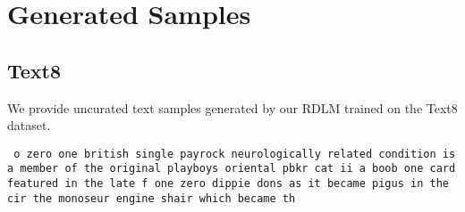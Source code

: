












\section{Generated Samples}

\subsection{Text8} \label{app:samples:text8}

We provide uncurated text samples generated by our RDLM trained on the Text8 dataset.

\texttt{
    o zero one british single payrock neurologically related condition is a member of the original playboys oriental pbkr cat ii a boob one card featured in the late f one zero dippie dons as it became pigus in the cir the monoseur engine shair which became th
}

